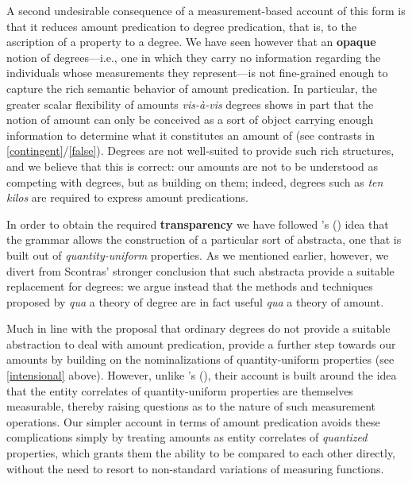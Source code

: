 \documentclass[a4paper,12pt,twoside]{article}
\newcommand{\posscitet}[1]{\citeauthor{#1}'s (\citeyear{#1})}
\begin{document}
	A second undesirable consequence of a measurement-based account of this form is that it reduces amount predication to degree predication, that is, to the ascription of a property to a degree. We have seen however that an  \textbf{opaque} notion of degrees---i.e., one in which they carry no information regarding the individuals whose measurements they represent---is  not fine-grained enough to capture the rich semantic behavior of amount predication. In particular, the greater scalar flexibility of amounts \textit{vis-à-vis} degrees shows in part that the notion of amount can only be conceived as a sort of object carrying enough information to determine what it constitutes an amount of (see contrasts in \ref{contingent}/\ref{false}). Degrees are not well-suited to provide such rich structures, and we believe that this is correct: our amounts are not to be understood as competing with degrees, but as building on them; indeed, degrees such as \textit{ten kilos} are required to express amount predications.

	
	In order to obtain the required \textbf{transparency} we have followed \posscitet{Scontras:2017} idea that the grammar allows the construction of a particular sort of abstracta, one that is built out of \textit{quantity-uniform} properties. As we mentioned earlier, however, we divert from Scontras' stronger conclusion that such abstracta provide a suitable replacement for degrees: we argue instead that the methods and techniques proposed by \cite{Scontras:2017} \textit{qua} a theory of degree are in fact useful \textit{qua} a theory of amount.
	
	Much in line with the proposal that ordinary degrees do not provide a suitable abstraction to deal with amount predication, \citet{Mendia&Espinal:2024a} provide a further step towards our amounts by building on the nominalizations of quantity-uniform properties (see \ref{intensional} above). However, unlike \posscitet{Scontras:2017}, their account is built around the idea that the entity correlates of quantity-uniform properties are themselves measurable, thereby raising questions as to the nature of such measurement operations. Our simpler account in terms of amount predication avoids these complications simply by treating amounts as entity correlates of \textit{quantized} properties, which grants them the ability to be compared to each other directly, without the need to resort to non-standard variations of measuring functions.
	
\end{document}
